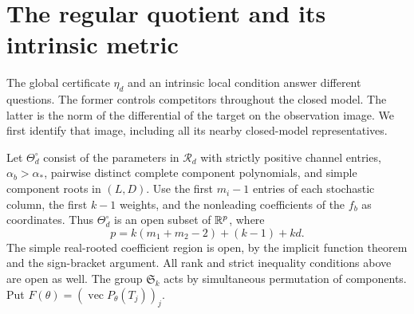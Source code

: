 \section{The regular quotient and its intrinsic metric}
\label{sec:local-condition}
The global certificate $\eta_d$ and an intrinsic local condition answer
different questions. The former controls competitors throughout the
closed model. The latter is the norm of the differential of the target
on the observation image. We first identify that image, including all
its nearby closed-model representatives.

Let $\Theta^\circ_d$ consist of the parameters in $\mathcal R_d$ with
strictly positive channel entries, $\alpha_b>\alpha_*$, pairwise distinct
complete component polynomials, and simple component roots in $(L,D)$.
Use the first $m_i-1$ entries of each stochastic column, the first $k-1$
weights, and the nonleading coefficients of the $f_b$ as coordinates.
Thus $\Theta^\circ_d$ is an open subset of $\mathbb R^p$, where
\[
 p=k(m_1+m_2-2)+(k-1)+kd.
\]
The simple real-rooted coefficient region is open, by the implicit
function theorem and the sign-bracket argument. All rank and strict
inequality conditions above are open as well. The group $\mathfrak S_k$
acts by simultaneous permutation of components. Put
$F(\theta)=(\operatorname{vec}P_\theta(T_j))_j$.

